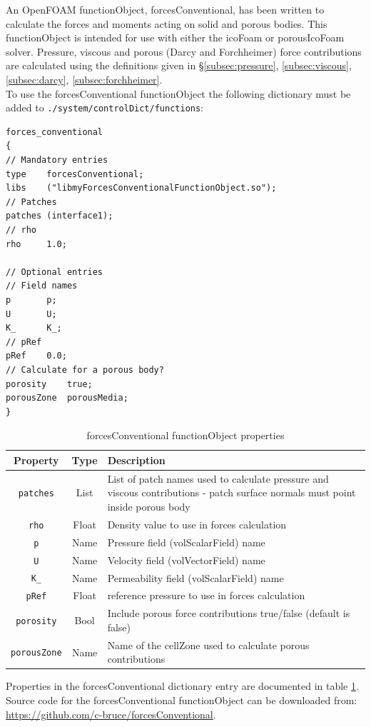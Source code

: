 \documentclass[a4paper,11pt]{report}
\begin{document}
An OpenFOAM functionObject, forcesConventional, has been written to calculate the forces and moments acting on solid and porous bodies. This functionObject is intended for use with either the icoFoam or porousIcoFoam solver. Pressure, viscous and porous (Darcy and Forchheimer) force contributions are calculated using the definitions given in §\ref{subsec:pressure}, \ref{subsec:viscous}, \ref{subsec:darcy}, \ref{subsec:forchheimer}.
\vspace{5mm}\\
To use the forcesConventional functionObject the following dictionary must be added to \texttt{./system/controlDict/functions}:
\begin{verbatim}
forces_conventional
{
// Mandatory entries
type	forcesConventional;
libs	("libmyForcesConventionalFunctionObject.so");
// Patches
patches	(interface1);
// rho
rho		1.0;

// Optional entries
// Field names
p		p;
U		U;
K_		K_;
// pRef
pRef	0.0;
// Calculate for a porous body?
porosity	true;
porousZone	porousMedia;
}
\end{verbatim}
\begin{table}[ht]
\begin{center}
\begin{tabularx}{\textwidth}{ c | c | p{105mm} }
    Property & Type & Description \\
    \hline\hline
    \texttt{patches} & List & List of patch names used to calculate pressure and viscous contributions - patch surface normals must point inside porous body \\
    \hline
    \texttt{rho} & Float & Density value to use in forces calculation \\
    \hline
    \texttt{p} & Name & Pressure field (volScalarField) name \\
    \hline
    \texttt{U} & Name & Velocity field (volVectorField) name \\
    \hline
    \texttt{K\_} & Name & Permeability field (volScalarField) name \\
    \hline
    \texttt{pRef} & Float & reference pressure to use in forces calculation \\
    \hline
    \texttt{porosity} & Bool & Include porous force contributions true/false (default is false) \\
    \hline
    \texttt{porousZone} & Name & Name of the cellZone used to calculate porous contributions \\
\end{tabularx}
\end{center}
\caption{forcesConventional functionObject properties}
\label{table:forcesConventional_dictionary}
\end{table}
Properties in the forcesConventional dictionary entry are documented in table \ref{table:forcesConventional_dictionary}. Source code for the forcesConventional functionObject can be downloaded from:\\\href{https://github.com/c-bruce/forcesConventional}{https://github.com/c-bruce/forcesConventional}.
\end{document}
